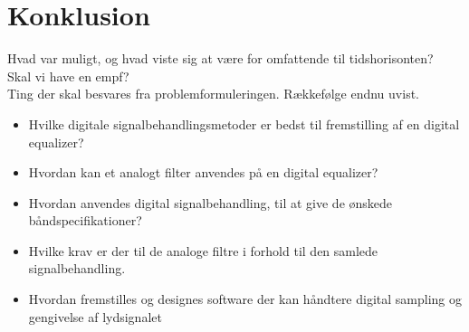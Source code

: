 \chapter{Konklusion} \label{kap:konklusion}
Hvad var muligt, og hvad viste sig at være for omfattende til tidshorisonten? \\
Skal vi have en empf?
\\

Ting der skal besvares fra problemformuleringen. Rækkefølge endnu uvist.
\begin{itemize}[noitemsep]
	\item Hvilke digitale signalbehandlingsmetoder er bedst til fremstilling af en digital equalizer?
	\item Hvordan kan et analogt filter anvendes på en digital equalizer?
	\item Hvordan anvendes digital signalbehandling, til at give de ønskede båndspecifikationer?
	\item Hvilke krav er der til de analoge filtre i forhold til den samlede signalbehandling.
	\item Hvordan fremstilles og designes software der kan håndtere digital sampling og gengivelse af lydsignalet
\end{itemize}

